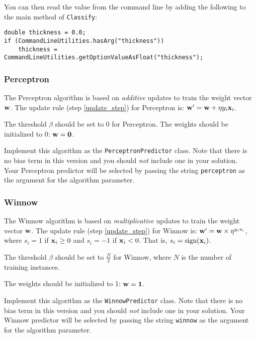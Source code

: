 \documentclass[11pt]{article}
\newcommand{\vw}{{\bf w}}
\newcommand{\vxi}{{\bf x}_i}
\newcommand{\yi}{y_i}
\newcommand{\code}[1]{{\footnotesize \tt #1}}
\begin{document}
You can then read the value from the command line by adding the following to the main method of \code{Classify}:
\begin{footnotesize}
\begin{verbatim}
double thickness = 0.0;
if (CommandLineUtilities.hasArg("thickness"))
    thickness = CommandLineUtilities.getOptionValueAsFloat("thickness");
\end{verbatim}
\end{footnotesize}

\subsubsection{Perceptron}

The Perceptron algorithm is based on {\em additive} updates to train the weight vector $\vw$. The update rule (step \ref{update_step})  for Perceptron is: $\vw' = \vw + \eta \yi \vxi$.


The threshold $\beta$ should be set to 0 for Perceptron. 
The weights should be initialized to 0: $\vw = {\bf 0}$.

Implement this algorithm as the \code{PerceptronPredictor} class. Note that there is no bias term in this version and you should \emph{not} include one in your solution. Your Perceptron predictor will be selected by passing the string \code{perceptron} as the argument for the algorithm parameter.

\subsubsection{Winnow}

The Winnow algorithm is based on {\em multiplicative} updates to train the weight vector $\vw$. The update rule (step \ref{update_step}) for Winnow is: $\vw' = \vw \times \eta^{\yi s_i}$, where $s_i=1$ if $\vxi \ge 0$ and $s_i=-1$ if $\vxi < 0$. That is, $s_i = \textrm{sign}(\vxi)$. 


The threshold $\beta$ should be set to $\frac{N}{2}$ for Winnow, where $N$ is the number of training instances. 

The weights should be initialized to 1: $\vw = {\bf 1}$.

Implement this algorithm as the \code{WinnowPredictor} class. Note that there is no bias term in this version and you should \emph{not} include one in your solution. Your Winnow predictor will be selected by passing the string \code{winnow} as the argument for the algorithm parameter.
\end{document}
